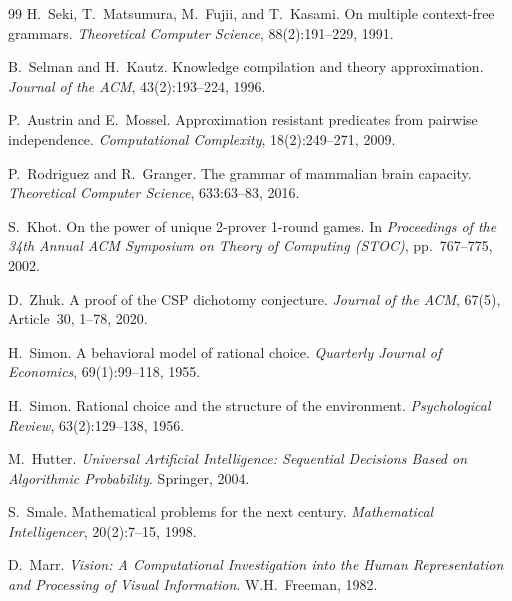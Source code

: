 \documentclass[11pt,a4paper]{article}
\theoremstyle{plain}
\theoremstyle{definition}
\theoremstyle{remark}
\begin{document}
\begin{thebibliography}{99}
H.~Seki, T.~Matsumura, M.~Fujii, and T.~Kasami.
\newblock On multiple context-free grammars.
\newblock \emph{Theoretical Computer Science}, 88(2):191--229, 1991.

B.~Selman and H.~Kautz.
\newblock Knowledge compilation and theory approximation.
\newblock \emph{Journal of the ACM}, 43(2):193--224, 1996.

P.~Austrin and E.~Mossel.
\newblock Approximation resistant predicates from pairwise independence.
\newblock \emph{Computational Complexity}, 18(2):249--271, 2009.

P.~Rodriguez and R.~Granger.
\newblock The grammar of mammalian brain capacity.
\newblock \emph{Theoretical Computer Science}, 633:63--83, 2016.

S.~Khot.
\newblock On the power of unique 2-prover 1-round games.
\newblock In \emph{Proceedings of the 34th Annual ACM Symposium on Theory of Computing (STOC)}, pp.~767--775, 2002.

D.~Zhuk.
\newblock A proof of the CSP dichotomy conjecture.
\newblock \emph{Journal of the ACM}, 67(5), Article~30, 1--78, 2020.

H.~Simon.
\newblock A behavioral model of rational choice.
\newblock \emph{Quarterly Journal of Economics}, 69(1):99--118, 1955.

H.~Simon.
\newblock Rational choice and the structure of the environment.
\newblock \emph{Psychological Review}, 63(2):129--138, 1956.

M.~Hutter.
\newblock \emph{Universal Artificial Intelligence: Sequential Decisions Based on Algorithmic Probability}.
\newblock Springer, 2004.

S.~Smale.
\newblock Mathematical problems for the next century.
\newblock \emph{Mathematical Intelligencer}, 20(2):7--15, 1998.

D.~Marr.
\newblock \emph{Vision: A Computational Investigation into the Human Representation and Processing of Visual Information}.
\newblock W.H.~Freeman, 1982.

\end{thebibliography}
\end{document}
